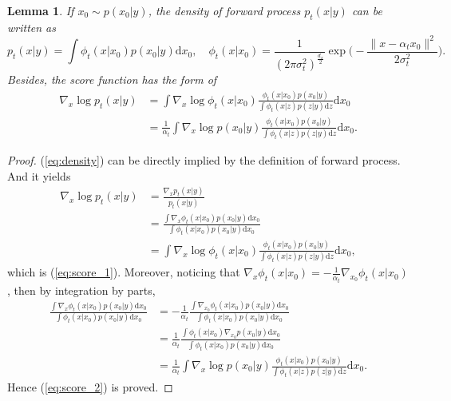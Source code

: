 \documentclass{article}
\numberwithin{equation}{section}
\def\eqref#1{equation~\ref{#1}}
\newcommand{\dif}{\mathrm{d}}
\newtheorem{lemma}[thm]{Lemma}
\theoremstyle{definition}
\renewcommand{\eqref}[1]{(\ref{#1})}
\begin{document}
\begin{lemma}
    If $x_0\sim p(x_0|y)$, the density of forward process $p_t(x|y)$ can be written as
    \begin{equation}\label{eq:density}
        p_t(x|y)=\int \phi_t(x|x_0)p(x_0|y)\dif x_0,\quad  \phi_t(x|x_0)=\frac{1}{(2\pi\sigma_t^2)^{\frac{d_x}{2}}}\exp\Big(-\frac{\|x-\alpha_tx_0\|^2}{2\sigma_t^2}\Big).
    \end{equation}
    Besides, the score function has the form of
    \begin{align}
        \nabla_x\log p_t(x|y)
        &=\int \nabla_x\log\phi_t(x|x_0)\frac{\phi_t(x|x_0)p(x_0|y)}{\int \phi_t(x|z)p(z|y)\dif z}\dif x_0 \label{eq:score_1}\\
        &=\frac{1}{\alpha_t}\int \nabla_x\log p(x_0|y)\frac{\phi_t(x|x_0)p(x_0|y)}{\int \phi_t(x|z)p(z|y)\dif z}\dif x_0. \label{eq:score_2}
    \end{align}
\end{lemma}

\begin{proof}
    \eqref{eq:density} can be directly implied by the definition of forward process.
    And it yields
    \begin{equation}
        \begin{aligned}
            \nabla_x\log p_t(x|y)
            &=\frac{\nabla_x p_t(x|y)}{p_t(x|y)} \\
            &=\frac{\int \nabla_x\phi_t(x|x_0)p(x_0|y)\dif x_0}{\int \phi_t(x|x_0)p(x_0|y)\dif x_0} \\
            &=\int \nabla_x\log\phi_t(x|x_0)\frac{\phi_t(x|x_0)p(x_0|y)}{\int \phi_t(x|z)p(z|y)\dif z}\dif x_0,
        \end{aligned}
    \end{equation}
    which is \eqref{eq:score_1}. 
    Moreover, noticing that $\nabla_x\phi_t(x|x_0)=-\frac{1}{\alpha_t}\nabla_{x_0}\phi_t(x|x_0)$, then by integration by parts,
    \begin{equation}
        \begin{aligned}
            \frac{\int \nabla_x\phi_t(x|x_0)p(x_0|y)\dif x_0}{\int \phi_t(x|x_0)p(x_0|y)\dif x_0}
            &= -\frac{1}{\alpha_t}\frac{\int \nabla_{x_0}\phi_t(x|x_0)p(x_0|y)\dif x_0}{\int \phi_t(x|x_0)p(x_0|y)\dif x_0} \\
            &= \frac{1}{\alpha_t}\frac{\int \phi_t(x|x_0)\nabla_{x_0}p(x_0|y)\dif x_0}{\int \phi_t(x|x_0)p(x_0|y)\dif x_0} \\
            &=\frac{1}{\alpha_t}\int \nabla_x\log p(x_0|y)\frac{\phi_t(x|x_0)p(x_0|y)}{\int \phi_t(x|z)p(z|y)\dif z}\dif x_0.
        \end{aligned}
    \end{equation}
    Hence \eqref{eq:score_2} is proved.
\end{proof}
\end{document}
